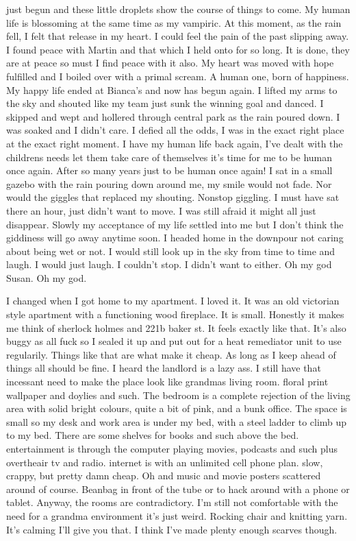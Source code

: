 just begun and these little droplets show the course of things to come. My human life is blossoming at the same time as my vampiric. At this moment, as the rain fell, I felt that release in my heart. I could feel the pain of the past slipping away. I found peace with Martin and that which I held onto for so long. It is done, they are at peace so must I find peace with it also. My heart was moved with hope fulfilled and I boiled over with a primal scream. A human one, born of happiness. My happy life ended at Bianca's and now has begun again. I lifted my arms to the sky and shouted like my team just sunk the winning goal and danced. I skipped and wept and hollered through central park as the rain poured down. I was soaked and I didn't care. I defied all the odds, I was in the exact right place at the exact right moment. I have my human life back again, I've dealt with the childrens needs let them take care of themselves it's time for me to be human once again. After so many years just to be human once again!
I sat in a small gazebo with the rain pouring down around me, my smile would not fade. Nor would the giggles that replaced my shouting. Nonstop giggling. I must have sat there an hour, just didn't want to move. I was still afraid it might all just disappear. Slowly my acceptance of my life settled into me but I don't think the giddiness will go away anytime soon. I headed home in the downpour not caring about being wet or not. I would still look up in the sky from time to time and laugh. I would just laugh. I couldn't stop. I didn't want to either. Oh my god Susan. Oh my god.

I changed when I got home to my apartment. I loved it. It was an old victorian style apartment with a functioning wood fireplace. It is small. Honestly it makes me think of sherlock holmes and 221b baker st. It feels exactly like that. It's also buggy as all fuck so I sealed it up and put out for a heat remediator unit to use regularily. Things like that are what make it cheap. As long as I keep ahead of things all should be fine. I heard the landlord is a lazy ass. I still have that incessant need to make the place look like grandmas living room. floral print wallpaper and doylies and such. The bedroom is a complete rejection of the living area with solid bright colours, quite a bit of pink, and a bunk office. The space is small so my desk and work area is under my bed, with a steel ladder to climb up to my bed. There are some shelves for books and such above the bed. entertainment is through the computer playing movies, podcasts and such plus overtheair tv and radio. internet is with an unlimited cell phone plan. slow, crappy, but pretty damn cheap. Oh and music and movie posters scattered around of course. Beanbag in front of the tube or to hack around with a phone or tablet. Anyway, the rooms are contradictory. I'm still not comfortable with the need for a grandma environment it's just weird. Rocking chair and knitting yarn. It's calming I'll give you that. I think I've made plenty enough scarves though.

